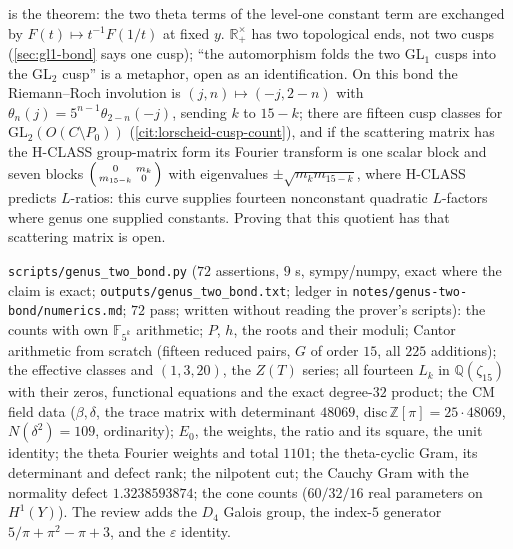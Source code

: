 \begin{observation}
\label{obs:two-ends-fold}
 is the theorem: the two theta terms of the level-one constant term are exchanged by
$F(t)\mapsto t^{-1}F(1/t)$ at fixed $y$. $\mathbb R_+^\times$ has two topological ends, not two cusps (\cref{sec:gl1-bond} says one
cusp); ``the automorphism folds the two GL$_1$ cusps into the GL$_2$ cusp'' is a metaphor, open as an identification. On
this bond the Riemann--Roch involution is $(j,n)\mapsto(-j,2-n)$ with $\theta_n(j) = 5^{n-1}\theta_{2-n}(-j)$, sending $k$ to $15-k$;
there are fifteen cusp classes for $\mathrm{GL}_2(O(C\setminus P_0))$ (\cref{cit:lorscheid-cusp-count}), and if the scattering matrix
has the H-CLASS group-matrix form its Fourier transform is one scalar block and seven blocks
$\begin{psmallmatrix}0&m_k\\m_{15-k}&0\end{psmallmatrix}$ with eigenvalues $\pm\sqrt{m_km_{15-k}}$, where H-CLASS predicts $L$-ratios:
this curve supplies fourteen nonconstant quadratic $L$-factors where genus one supplied constants. Proving that this
quotient has that scattering matrix is open.
\end{observation}

\begin{numerical}
\label{num:genus-two-bond}
\texttt{scripts/genus\_two\_bond.py} ($72$ assertions, $9$ s, sympy/numpy, exact where the claim is exact;
\texttt{outputs/genus\_two\_bond.txt}; ledger in \texttt{notes/genus-two-bond/numerics.md}; $72$ pass; written without reading the
prover's scripts): the counts with own $\mathbb F_{5^k}$ arithmetic; $P$, $h$, the roots and their moduli; Cantor arithmetic from
scratch (fifteen reduced pairs, $G$ of order $15$, all $225$ additions); the effective classes and $(1,3,20)$, the $Z(T)$ series;
all fourteen $L_k$ in $\mathbb Q(\zeta_{15})$ with their zeros, functional equations and the exact degree-$32$ product; the CM
field data ($\beta,\delta$, the trace matrix with determinant $48069$, $\mathrm{disc}\,\mathbb Z[\pi] = 25\cdot48069$, $N(\delta^2) = 109$,
ordinarity); $E_0$, the weights, the ratio and its square, the unit identity; the theta Fourier weights and total $1101$;
the theta-cyclic Gram, its determinant and defect rank; the nilpotent cut; the Cauchy Gram with the normality defect
$1.3238593874$; the cone counts ($60/32/16$ real parameters on $H^1(Y)$). The review adds the $D_4$ Galois group, the
index-$5$ generator $5/\pi+\pi^2-\pi+3$, and the $\varepsilon$ identity.
\end{numerical}

